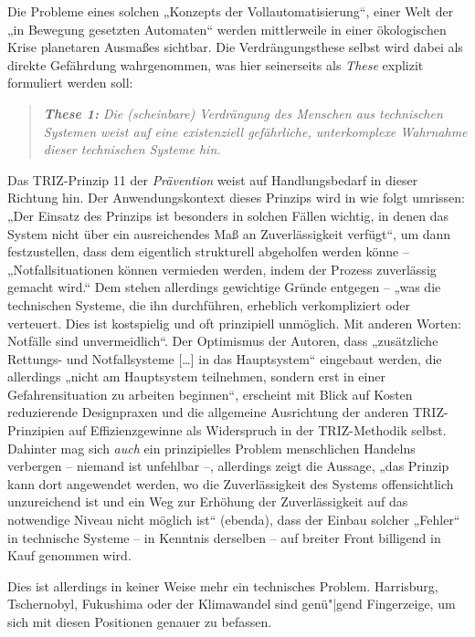 \documentclass[11pt,a4paper]{article}
\begin{document}
Die Probleme eines solchen „Konzepts der Vollautomatisierung“, einer Welt der
„in Bewegung gesetzten Automaten“ werden mittlerweile in einer ökologischen
Krise planetaren Ausmaßes sichtbar. Die Verdrängungsthese selbst wird dabei
als direkte Gefährdung wahrgenommen, was hier seinerseits als \emph{These}
explizit formuliert werden soll:
\begin{quote}\it
  \textbf{These 1:} Die (scheinbare) Verdrängung des Menschen aus technischen
  Systemen weist auf eine existenziell gefährliche, unterkomplexe Wahrnahme
  dieser technischen Systeme hin.
\end{quote}
Das TRIZ-Prinzip 11 der \emph{Prävention} weist auf Handlungsbedarf in dieser
Richtung hin. Der Anwendungskontext dieses Prinzips wird in \cite{TT} wie
folgt umrissen: „Der Einsatz des Prinzips ist besonders in solchen Fällen
wichtig, in denen das System nicht über ein ausreichendes Maß an
Zuverlässigkeit verfügt“, um dann festzustellen, dass dem eigentlich
strukturell abgeholfen werden könne -- „Notfallsituationen können vermieden
werden, indem der Prozess zuverlässig gemacht wird.“ Dem stehen allerdings
gewichtige Gründe entgegen -- „was die technischen Systeme, die ihn
durchführen, erheblich verkompliziert oder verteuert. Dies ist kostspielig und
oft prinzipiell unmöglich. Mit anderen Worten: Notfälle sind
unvermeidlich“. Der Optimismus der Autoren, dass „zusätzliche Rettungs- und
Notfallsysteme [\ldots] in das Hauptsystem“ eingebaut werden, die allerdings
„nicht am Hauptsystem teilnehmen, sondern erst in einer Gefahrensituation zu
arbeiten beginnen“, erscheint mit Blick auf Kosten reduzierende Designpraxen
und die allgemeine Ausrichtung der anderen TRIZ-Prinzipien auf
Effizienzgewinne als Widerspruch in der TRIZ-Methodik selbst.  Dahinter mag
sich \emph{auch} ein prinzipielles Problem menschlichen Handelns verbergen --
niemand ist unfehlbar --, allerdings zeigt die Aussage, „das Prinzip kann dort
angewendet werden, wo die Zuverlässigkeit des Systems offensichtlich
unzureichend ist und ein Weg zur Erhöhung der Zuverlässigkeit auf das
notwendige Niveau nicht möglich ist“ (ebenda), dass der Einbau solcher
„Fehler“ in technische Systeme -- in Kenntnis derselben -- auf breiter Front
billigend in Kauf genommen wird.

Dies ist allerdings in keiner Weise mehr ein technisches Problem.  Harrisburg,
Tschernobyl, Fukushima oder der Klimawandel sind genü"|gend Fingerzeige, um
sich mit diesen Positionen genauer zu befassen.
\end{document}

